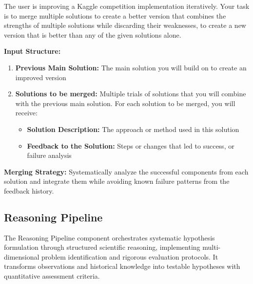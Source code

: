 \begin{tcolorbox}[
  colback=gray!5,
  colframe=gray!80,
  title=Multi-Trace Solution Merging –--- Exploration Path Structuring Component,
  breakable
]
The user is improving a Kaggle competition implementation iteratively.
Your task is to merge multiple solutions to create a better version that combines the strengths of multiple solutions while discarding their weaknesses, to create a new version that is better than any of the given solutions alone.

\textbf{Input Structure:}
\begin{enumerate}
    \item \textbf{Previous Main Solution:} The main solution you will build on to create an improved version
    \item \textbf{Solutions to be merged:} Multiple trials of solutions that you will combine with the previous main solution. For each solution to be merged, you will receive:
    \begin{itemize}
        \item \textbf{Solution Description:} The approach or method used in this solution
        \item \textbf{Feedback to the Solution:} Steps or changes that led to success, or failure analysis
    \end{itemize}
\end{enumerate}

\textbf{Merging Strategy:}
Systematically analyze the successful components from each solution and integrate them while avoiding known failure patterns from the feedback history.
\end{tcolorbox}

\subsection{Reasoning Pipeline}

The Reasoning Pipeline component orchestrates systematic hypothesis formulation through structured scientific reasoning, implementing multi-dimensional problem identification and rigorous evaluation protocols. It transforms observations and historical knowledge into testable hypotheses with quantitative assessment criteria.

